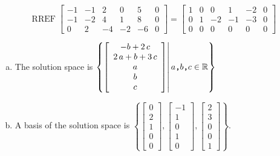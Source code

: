 \begin{exerciseAnswer} 


\[\operatorname{RREF} \left[\begin{array}{ccccc|c}
-1 & -1 & 2 & 0 & 5 & 0 \\
-1 & -2 & 4 & 1 & 8 & 0 \\
0 & 2 & -4 & -2 & -6 & 0
\end{array}\right] = \left[\begin{array}{ccccc|c}
1 & 0 & 0 & 1 & -2 & 0 \\
0 & 1 & -2 & -1 & -3 & 0 \\
0 & 0 & 0 & 0 & 0 & 0
\end{array}\right] \]


\begin{enumerate}[(a)]
\item The solution space is \( \left\{ \left[\begin{array}{c}
-b + 2 \, c \\
2 \, a + b + 3 \, c \\
a \\
b \\
c
\end{array}\right] \middle|\,a\text{\texttt{,}}b\text{\texttt{,}}c\in\mathbb{R}\right\} \)
\item A basis of the solution space is \( \left\{ \left[\begin{array}{c}
0 \\
2 \\
1 \\
0 \\
0
\end{array}\right] , \left[\begin{array}{c}
-1 \\
1 \\
0 \\
1 \\
0
\end{array}\right] , \left[\begin{array}{c}
2 \\
3 \\
0 \\
0 \\
1
\end{array}\right] \right\} \).
\end{enumerate}
    
\end{exerciseAnswer}
    
